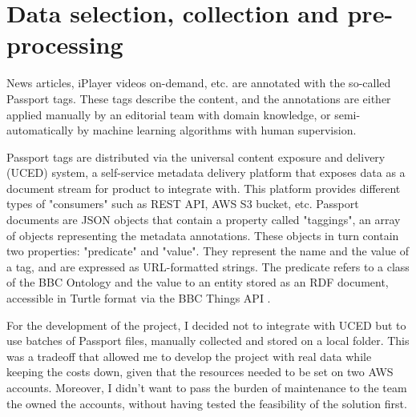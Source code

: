 
\section{Data selection, collection and pre-processing}

News articles, iPlayer videos on-demand, etc. are annotated with the so-called Passport tags.
These tags describe the content, and the annotations are either applied manually
by an editorial team with domain knowledge, or semi-automatically by machine learning algorithms with human supervision.

Passport tags are distributed via the universal content exposure and delivery (UCED) system,
a self-service metadata delivery platform that exposes data as a document stream for product to integrate with.
This platform provides different types of "consumers" such as REST API, AWS S3 bucket, etc.
Passport documents are JSON objects that contain a property called "taggings", an array of objects representing the
metadata annotations. These objects in turn contain two properties: "predicate" and "value". They represent the name and the value of
a tag, and are expressed as URL-formatted strings. The predicate refers to a class of the BBC Ontology \cite{BBC:Ontologies}
and the value to an entity stored as an RDF document, accessible in Turtle format \cite{W3C:Turtle} via the BBC Things API \cite{BBC:Things,BBC:Things:About,BBC:Things:API}.

For the development of the project, I decided not to integrate with UCED but to use batches of Passport files, manually collected and stored
on a local folder.
This was a tradeoff that allowed me to develop the project with real data while keeping the costs down, given that the resources needed to
be set on two AWS accounts. Moreover, I didn't want to pass the burden of maintenance to the team the owned the accounts, without having tested
the feasibility of the solution first.

